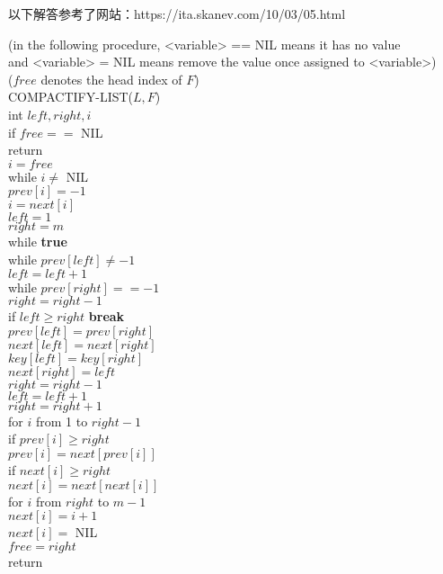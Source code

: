 \documentclass[12pt, a4paper, UTF8]{ctexart}
\begin{document}
\begin{remark}
  以下解答参考了网站：https://ita.skanev.com/10/03/05.html
\end{remark}

\begin{solution}
  (in the following procedure, <variable> == NIL means it has no value\\
  and <variable> = NIL means remove the value once assigned to <variable>)\\
  ($free$ denotes the head index of $F$)\\
  COMPACTIFY-LIST($L,F$)\\
  \indent int $left, right, i$\\
  \indent if $free ==$ NIL\\
  \indent\indent return\\
  \indent $i = free$\\
  \indent while $i\neq$ NIL\\
  \indent\indent $prev[i] = -1$\\
  \indent\indent $i = next[i]$\\
  \indent $left = 1$\\
  \indent $right = m$\\
  \indent while \textbf{true}\\
  \indent\indent while $prev[left]\neq -1$\\
  \indent\indent\indent $left = left + 1$\\
  \indent\indent while $prev[right] == -1$\\
  \indent\indent\indent $right = right - 1$\\
  \indent\indent if $left \geq right$ \textbf{break}\\

  \indent\indent $prev[left] = prev[right]$\\
  \indent\indent $next[left] = next[right]$\\
  \indent\indent $key[left] = key[right]$\\

  \indent\indent $next[right] = left$\\
  \indent\indent $right = right - 1$\\
  \indent\indent $left = left + 1$\\

  \indent $right = right + 1$\\
  \indent for $i$ from 1 to $right - 1$\\
  \indent\indent if $prev[i]\geq right$\\
  \indent\indent\indent $prev[i] = next[prev[i]]$\\
  \indent\indent if $next[i]\geq right$\\
  \indent\indent\indent $next[i] = next[next[i]]$\\
  \indent for $i$ from $right$ to $m - 1$\\
  \indent\indent $next[i] = i + 1$\\
  \indent $next[i] = $ NIL\\
  \indent $free = right$\\
  \indent return
\end{solution}
\end{document}
